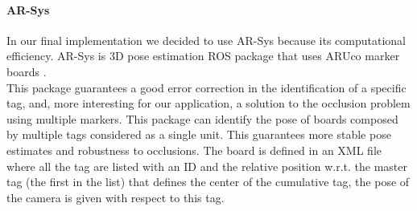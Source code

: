 \paragraph{AR-Sys}
In our final implementation we decided to use AR-Sys because its computational efficiency. AR-Sys is 3D pose estimation ROS package that uses ARUco marker boards \cite{Aruco2014}.\\
This package guarantees a good error correction in the identification of a specific tag, and, more interesting for our application, a solution to the occlusion problem using multiple markers. This package can identify the pose of boards composed by multiple tags considered as a single unit. This guarantees more stable pose estimates and robustness to occlusions. The board is defined in an XML file where all the tag are listed with an ID and the relative position w.r.t. the master tag (the first in the list) that defines the center of the cumulative tag, the pose of the camera is given with respect to this tag. 

